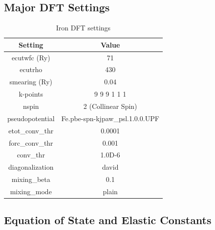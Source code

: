 \subsection{Major DFT Settings}
\begin{table}[h]
\begin{center}
\renewcommand{\arraystretch}{1.2}
\begin{tabular}{c c}
\hline\hline
Setting & Value \\
\hline\hline
ecutwfc (Ry) & 71 \\
ecutrho & 430 \\
smearing (Ry) & 0.04 \\
k-points &  9 9 9 1 1 1   \\
nspin & 2 (Collinear Spin)   \\
pseudopotential &   Fe.pbe-spn-kjpaw\_psl.1.0.0.UPF   \\
etot\_conv\_thr & 0.0001 \\
forc\_conv\_thr & 0.001 \\ 
conv\_thr & 1.0D-6 \\ 
diagonalization & david \\ 
mixing\_beta & 0.1 \\ 
mixing\_mode & plain \\ 
\hline\hline
\end{tabular}
\end{center}
\caption{Iron DFT settings}
\label{table:fefccdftsettings}
\end{table}



\FloatBarrier
\subsection{Equation of State and Elastic Constants}

